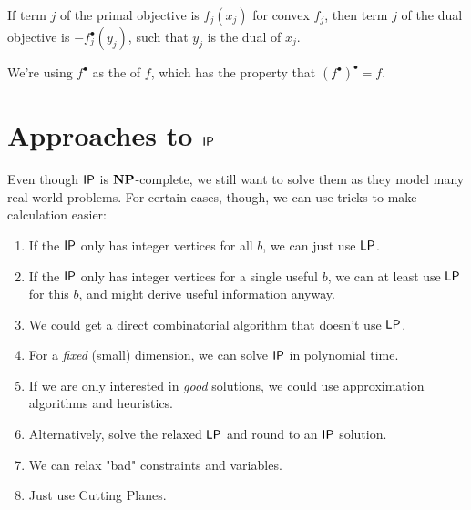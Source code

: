 \begin{fact}
    If term $j$ of the primal objective is $f_j(x_j)$ for convex $f_j$,
    then term $j$ of the dual objective is $-f_j^\bullet(y_j)$, such that
    $y_j$ is the dual of $x_j$.

    We're using $f^\bullet$ as the  of $f$, which has the property that
    $(f^\bullet)^\bullet=f$.
\end{fact}
\section{Approaches to $\mathsf{IP}$}
Even though $\mathsf{IP}$ is $\mathbf{NP}$-complete, we still want to solve them as they model many real-world problems.
For certain cases, though, we can use tricks to make calculation easier:
\begin{enumerate}
    \item If the $\mathsf{IP}$ only has integer vertices for all $b$, we can just use $\mathsf{LP}$.
    \item If the $\mathsf{IP}$ only has integer vertices for a single useful $b$, we can at least use $\mathsf{LP}$ for this $b$, and might derive useful information anyway.
    \item We could get a direct combinatorial algorithm that doesn't use $\mathsf{LP}$. 
    \item For a \emph{fixed} (small) dimension, we can solve $\mathsf{IP}$ in polynomial time.
    \item If we are only interested in \emph{good} solutions, we could use approximation algorithms and heuristics.
    \item Alternatively, solve the relaxed $\mathsf{LP}$ and round to an $\mathsf{IP}$ solution.
    \item We can relax "bad" constraints and variables.
    \item Just use Cutting Planes.
\end{enumerate}

